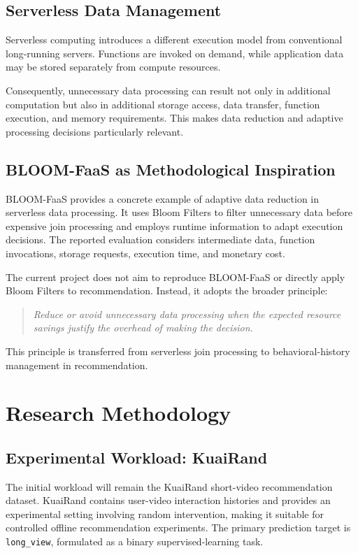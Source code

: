 \documentclass[12pt,a4paper]{article}
\begin{document}
\subsection{Serverless Data Management}
Serverless computing introduces a different execution model from conventional long-running servers. Functions are invoked on demand, while application data may be stored separately from compute resources.

Consequently, unnecessary data processing can result not only in additional computation but also in additional storage access, data transfer, function execution, and memory requirements. This makes data reduction and adaptive processing decisions particularly relevant.

\subsection{BLOOM-FaaS as Methodological Inspiration}
BLOOM-FaaS provides a concrete example of adaptive data reduction in serverless data processing. It uses Bloom Filters to filter unnecessary data before expensive join processing and employs runtime information to adapt execution decisions. The reported evaluation considers intermediate data, function invocations, storage requests, execution time, and monetary cost.

The current project does not aim to reproduce BLOOM-FaaS or directly apply Bloom Filters to recommendation. Instead, it adopts the broader principle:
\begin{quote}
\textit{Reduce or avoid unnecessary data processing when the expected resource savings justify the overhead of making the decision.}
\end{quote}
This principle is transferred from serverless join processing to behavioral-history management in recommendation.

\section{Research Methodology}

\subsection{Experimental Workload: KuaiRand}
The initial workload will remain the KuaiRand short-video recommendation dataset. KuaiRand contains user-video interaction histories and provides an experimental setting involving random intervention, making it suitable for controlled offline recommendation experiments. The primary prediction target is \texttt{long\_view}, formulated as a binary supervised-learning task.
\end{document}
